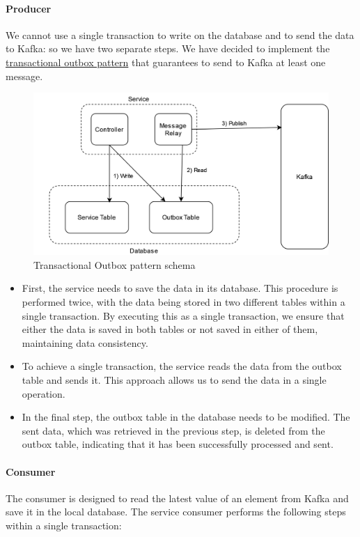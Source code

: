 \documentclass[11pt]{article}
\begin{document}
\paragraph{Producer}

We cannot use a single transaction to write on the database and to send the data to Kafka: so we have two separate steps. We have decided to implement the \href{https://microservices.io/patterns/data/transactional-outbox.html}{transactional outbox pattern} that guarantees to send to Kafka at least one message.

\begin{figure}[H]
    \centering
    \includegraphics[width=0.7\linewidth]{resources/Trasnactional-outbox-pattern.png}
    \caption{Transactional Outbox pattern schema}
\end{figure}

\begin{itemize}
    \item First, the service needs to save the data in its database. This procedure is performed twice, with the data being stored in two different tables within a single transaction. By executing this as a single transaction, we ensure that either the data is saved in both tables or not saved in either of them, maintaining data consistency.
    \item To achieve a single transaction, the service reads the data from the outbox table and sends it. This approach allows us to send the data in a single operation.
    \item In the final step, the outbox table in the database needs to be modified. The sent data, which was retrieved in the previous step, is deleted from the outbox table, indicating that it has been successfully processed and sent.
\end{itemize}

\paragraph{Consumer}
The consumer is designed to read the latest value of an element from Kafka and save it in the local database. The service consumer performs the following steps within a single transaction:
\end{document}
